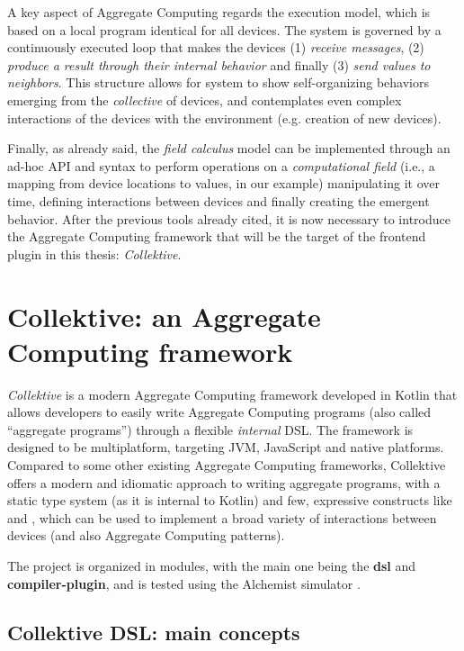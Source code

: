 \documentclass[12pt,a4paper,openright,twoside]{book}
\begin{document}
A key aspect of Aggregate Computing regards the execution model, which is based
on a local program identical for all devices. The system is governed by a
continuously executed loop that makes the devices (1) \emph{receive messages},
(2) \emph{produce a result through their internal behavior} and finally (3)
\emph{send values to neighbors}. 
%
This structure allows for system to show self-organizing behaviors emerging from
the \emph{collective} of devices, and contemplates even complex interactions of
the devices with the environment (e.g. creation of new devices).

Finally, as already said, the \emph{field calculus} model can be implemented
through an ad-hoc API and syntax to perform operations on a \emph{computational
field} (i.e., a mapping from device locations to values, in our example)
manipulating it over time, defining interactions between devices and finally
creating the emergent behavior.
%
After the previous tools already cited, it is now necessary to
introduce the Aggregate Computing framework that will be the target of the
frontend plugin in this thesis: \emph{Collektive}.

\section{Collektive: an Aggregate Computing framework}

\emph{Collektive} is a modern Aggregate Computing framework developed in Kotlin
that allows developers to easily write Aggregate Computing programs (also called
``aggregate programs'') through a flexible \emph{internal} \ac{DSL}. The
framework is designed to be multiplatform, targeting JVM, JavaScript and
native platforms.
%
Compared to some other existing Aggregate Computing frameworks, Collektive
offers a modern and idiomatic approach to writing aggregate programs,
with a static type system (as it is internal to Kotlin) and few, expressive
constructs like  and , which can be
used to implement a broad variety of interactions between devices (and also
Aggregate Computing patterns).

The project is organized in modules, with the main one being the \textbf{dsl}
and \textbf{compiler-plugin}, and is tested using the Alchemist simulator
\cite{DBLP:journals/jos/PianiniMV13}. 

\subsection{Collektive DSL: main concepts} \label{sec:collektive-dsl}
\end{document}
